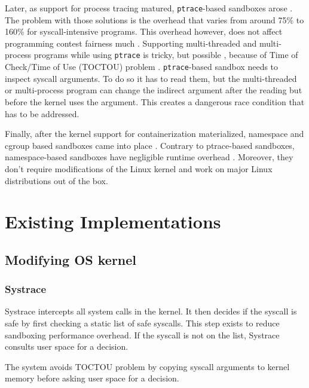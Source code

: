 \documentclass[en]{pracamgr}
\begin{document}
Later, as support for process tracing matured, \texttt{ptrace}-based sandboxes arose \cite{marevs2007perspectives, kolstad2009infrastructure, kim2013practical}. The problem with those solutions is the overhead that varies from around 75\% \cite{merry2010performance} to 160\% \cite{marevs2012new} for syscall-intensive programs. This overhead however, does not affect programming contest fairness much \cite{marevs2011fairness}. Supporting multi-threaded and multi-process programs while using \texttt{ptrace} is tricky, but possible \cite{kim2013practical}, because of Time of Check/Time of Use (TOCTOU) problem \cite{cwe_toctou}. \texttt{ptrace}-based sandbox needs to inspect syscall arguments. To do so it has to read them, but the multi-threaded or multi-process program can change the indirect argument after the reading but before the kernel uses the argument. This creates a dangerous race condition that has to be addressed.

Finally, after the kernel support for containerization materialized, namespace and cgroup based sandboxes came into place \cite{marevs2012new, netblue30/firejail, raknes2016nsroot, google/nsjail, flatpak, SPACEK20151665}. Contrary to ptrace-based sandboxes, namespace-based sandboxes have negligible runtime overhead \cite{marevs2012new}. Moreover, they don't require modifications of the Linux kernel and work on major Linux distributions out of the box.

\section{Existing Implementations}

\subsection{Modifying OS kernel}

\subsubsection{Systrace}

Systrace \cite{provos2003improving} intercepts all system calls in the kernel. It then decides if the syscall is safe by first checking a static list of safe syscalls. This step exists to reduce sandboxing performance overhead. If the syscall is not on the list, Systrace consults user space for a decision.

The system avoids TOCTOU problem \cite{cwe_toctou} by copying syscall arguments to kernel memory before asking user space for a decision.
\end{document}
